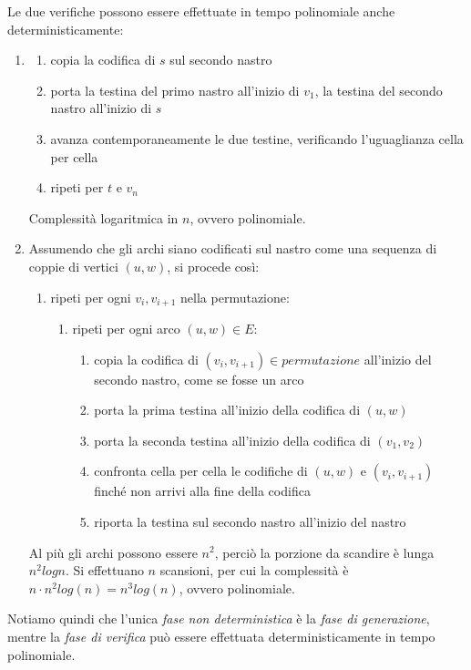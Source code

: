 Le due verifiche possono essere effettuate in tempo polinomiale anche deterministicamente:
\begin{enumerate}[label*=\arabic*.]
	\item \begin{enumerate}[label*=\arabic*.]
		\item copia la codifica di $s$ sul secondo nastro
		\item porta la testina del primo nastro all'inizio di $v_1$, la testina del secondo nastro all'inizio di $s$
		\item avanza contemporaneamente le due testine, verificando l'uguaglianza cella per cella
		\item ripeti per $t$ e $v_n$
	\end{enumerate}
	Complessità logaritmica in $n$, ovvero polinomiale.

	\item Assumendo che gli archi siano codificati sul nastro come una sequenza di coppie di vertici $(u, w)$, si procede così:
	\begin{enumerate}[label*=\arabic*.]
		\item ripeti per ogni $v_i, v_{i+1}$ nella permutazione:
		\begin{enumerate}[label*=\arabic*.]
			\item ripeti per ogni arco $(u, w) \in E$:
			\begin{enumerate}[label*=\arabic*.]
				\item copia la codifica di $(v_i, v_{i+1}) \in permutazione$ all'inizio del secondo nastro, come se fosse un arco
				\item porta la prima testina all'inizio della codifica di $(u, w)$
				\item porta la seconda testina all'inizio della codifica di $(v_1, v_2)$
				\item confronta cella per cella le codifiche di $(u, w)$ e $(v_i, v_{i+1})$ finché non arrivi alla fine della codifica
				\item riporta la testina sul secondo nastro all'inizio del nastro
			\end{enumerate}
		\end{enumerate}
	\end{enumerate}
	Al più gli archi possono essere $n^2$, perciò la porzione da scandire è lunga $n^2 log n$. Si effettuano $n$ scansioni, per cui la complessità è $n \cdot n^2log(n) = n^3 log(n)$, ovvero polinomiale.
\end{enumerate}
Notiamo quindi che l'unica \emph{fase non deterministica} è la \emph{fase di generazione}, mentre la \emph{fase di verifica} può essere effettuata deterministicamente in tempo polinomiale.


